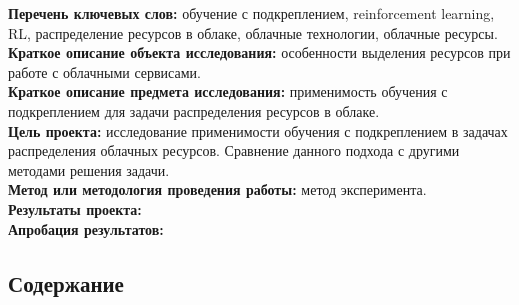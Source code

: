 \documentclass{article}
\begin{document}
\textbf{Перечень ключевых слов: }обучение с подкреплением, reinforcement learning, RL, распределение ресурсов в облаке, облачные технологии, облачные ресурсы.\\
\textbf{Краткое описание объекта исследования:} особенности выделения ресурсов при работе с облачными сервисами.\\
\textbf{Краткое описание предмета исследования:} применимость обучения с подкреплением для задачи распределения ресурсов в облаке.\\
\textbf{Цель проекта:} исследование применимости обучения с подкреплением в задачах распределения облачных ресурсов. Сравнение данного подхода с другими методами решения задачи. \\
\textbf{Метод или методология проведения работы:} метод эксперимента.\\
\textbf{Результаты проекта:}\\
\textbf{Апробация результатов:}\\
\newpage
\begin{center}
\section {Содержание}
\tableofcontents
\end{center}
\newpage
\end{document}
